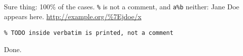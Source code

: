 \documentclass{article}
\begin{document}
Sure thing: 100\% of the cases. \verb|%| is not a comment, and \verb+a%b+ neither: Jane Doe appears here.
\url{http://example.org/%7Ejdoe/x} %
\begin{verbatim}
% TODO inside verbatim is printed, not a comment
\end{verbatim}

Done.
\end{document}
